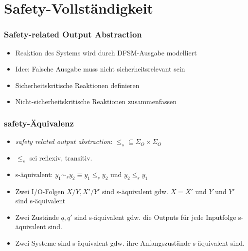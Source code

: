 \documentclass[10pt]{beamer}
\begin{document}
\begin{frame}
\begin{columns}[T]
\begin{column}{.70\textwidth}
\end{column}%

\end{columns}

\end{frame}

\section{Safety-Vollständigkeit}
\begin{frame}
\frametitle{Safety-related Output Abstraction}
\begin{itemize}
  \item<1-> Reaktion des Systems wird durch DFSM-Ausgabe modelliert
  \item<2-> Idee: Falsche Ausgabe muss nicht sicherheitsrelevant sein
  \item<3-> Sicherheitskritische Reaktionen definieren
  \item<4-> Nicht-sicherheitskritische Reaktionen zusammenfassen
\end{itemize}
\end{frame}

\begin{frame}
\frametitle{safety-Äquivalenz}
\begin{itemize}
  \item<1-> \emph{safety related output abstraction}: $\leq_s \subseteq \Sigma_O \times \Sigma_O$
  \item<2-> $\leq_s$ sei reflexiv, transitiv.
  \item<3-> s-äquivalent: $y_1 \sim_s y_2 \equiv y_1 \leq_s y_2$ und $y_2 \leq_s y_1$
  \item<4-> Zwei I/O-Folgen $X/Y, X'/Y'$ sind s-äquivalent gdw. $X=X'$ und $Y$ und $Y'$ sind s-äquivalent
  \item<5-> Zwei Zustände $q, q'$ sind s-äquivalent gdw. die Outputs für jede Inputfolge s-äquivalent sind.
  \item<6-> Zwei Systeme sind s-äquivalent gdw. ihre Anfangszustände s-äquivalent sind.
\end{itemize}
\end{frame}
\end{document}
